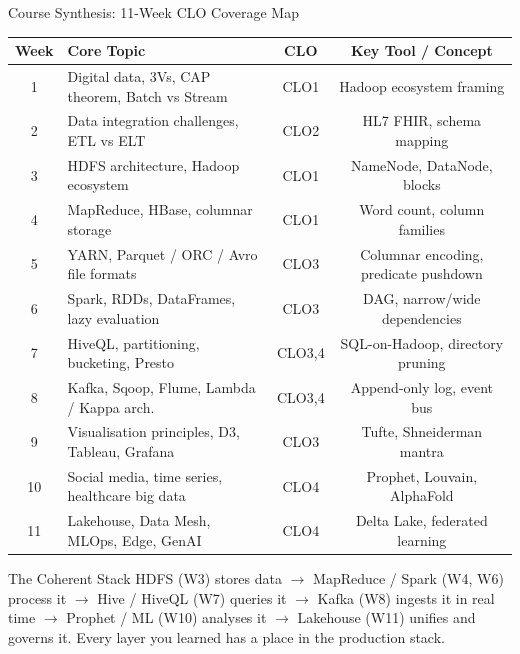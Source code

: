 \documentclass[aspectratio=169,10pt]{beamer}
\begin{document}
\begin{frame}{Course Synthesis: 11-Week CLO Coverage Map}
  \begin{center}
  \renewcommand{\arraystretch}{1.4}
  \begin{tabular}{c p{4.5cm} c c}
    \toprule
    \textbf{Week} & \textbf{Core Topic} & \textbf{CLO} & \textbf{Key Tool / Concept} \\
    \midrule
    1  & Digital data, 3Vs, CAP theorem, Batch vs Stream & CLO1 & Hadoop ecosystem framing \\
    2  & Data integration challenges, ETL vs ELT          & CLO2 & HL7 FHIR, schema mapping \\
    3  & HDFS architecture, Hadoop ecosystem              & CLO1 & NameNode, DataNode, blocks \\
    4  & MapReduce, HBase, columnar storage               & CLO1 & Word count, column families \\
    5  & YARN, Parquet / ORC / Avro file formats          & CLO3 & Columnar encoding, predicate pushdown \\
    6  & Spark, RDDs, DataFrames, lazy evaluation         & CLO3 & DAG, narrow/wide dependencies \\
    7  & HiveQL, partitioning, bucketing, Presto          & CLO3,4 & SQL-on-Hadoop, directory pruning \\
    8  & Kafka, Sqoop, Flume, Lambda / Kappa arch.       & CLO3,4 & Append-only log, event bus \\
    9  & Visualisation principles, D3, Tableau, Grafana   & CLO3 & Tufte, Shneiderman mantra \\
    10 & Social media, time series, healthcare big data   & CLO4 & Prophet, Louvain, AlphaFold \\
    11 & Lakehouse, Data Mesh, MLOps, Edge, GenAI         & CLO4 & Delta Lake, federated learning \\
    \bottomrule
  \end{tabular}
  \end{center}
  \vspace{4pt}
  \begin{alertblock}{The Coherent Stack}
    \small HDFS (W3) stores data $\to$ MapReduce / Spark (W4, W6) process it $\to$ Hive / HiveQL (W7) queries it $\to$ Kafka (W8) ingests it in real time $\to$ Prophet / ML (W10) analyses it $\to$ Lakehouse (W11) unifies and governs it.  Every layer you learned has a place in the production stack.
  \end{alertblock}
\end{frame}
\end{document}
